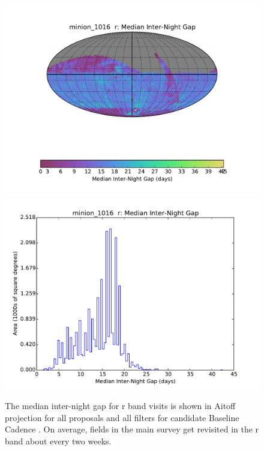 \begin{figure}[h!]
\vskip -0.0in
\includegraphics[angle=0,width=0.49\hsize,clip]{figs/cadence/minion_1016_Median_Inter-Night_Gap_r_HEAL_SkyMap.pdf}
\includegraphics[angle=0,width=0.49\hsize,clip]{figs/cadence/minion_1016_Median_Inter-Night_Gap_r_HEAL_Histogram.pdf}
\vskip -0.1in
\caption{The median inter-night gap for r band visits is shown in Aitoff projection
for all proposals and all filters for candidate Baseline Cadence .
On average, fields in the main survey get revisited in the r band about every two weeks.}
\label{fig:enigmaGapr}
\end{figure}

